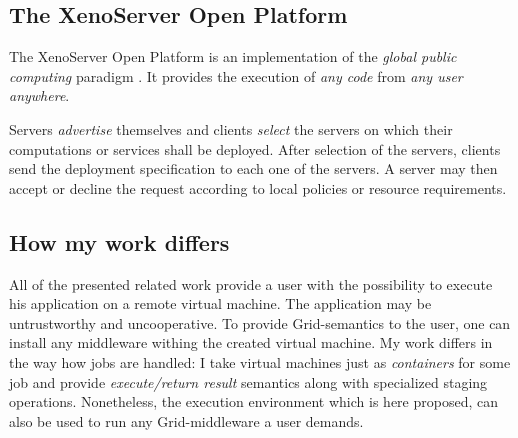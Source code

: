 \subsection{The XenoServer Open Platform}

The  XenoServer Open  Platform is  an implementation  of  the \emph{global
  public   computing}  paradigm   \cite{kotsovinos05}.  It   provides  the
execution of \emph{any code} from \emph{any user} \emph{anywhere}.

Servers \emph{advertise} themselves  and clients \emph{select} the servers
on which their computations or services shall be deployed. After selection
of the servers,  clients send the deployment specification  to each one of
the servers. A server may then  accept or decline the request according to
local policies or resource requirements.


\subsection{How my work differs}

All of the  presented related work provide a user  with the possibility to
execute his application on a  remote virtual machine.  The application may
be untrustworthy and uncooperative. To provide Grid-semantics to the user,
one can  install any middleware  withing the created virtual  machine.  My
work differs in the way how jobs are handled: I take virtual machines just
as \emph{containers} for some job and provide \emph{execute/return result}
semantics  along  with specialized  staging  operations. Nonetheless,  the
execution environment which is here proposed,  can also be used to run any
Grid-middleware a user demands.


